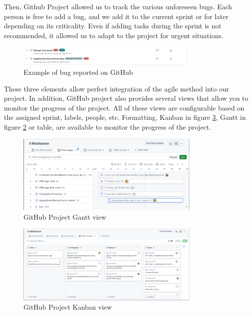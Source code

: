 \newpage

Then, Github Project allowed us to track the various unforeseen bugs.
Each person is free to add a bug, and we add it to the current sprint or for later depending on its criticality.
Even if adding tasks during the sprint is not recommended, it allowed us to adapt to the project for urgent situations.

\begin{figure}[h]
    \centering
    \includegraphics[width=0.8\textwidth]{img/GitHubBug}
    \caption{Example of bug reported on GitHub}
    \label{fig:GitHubBug}
\end{figure}

These three elements allow perfect integration of the agile method into our project.
In addition, GitHub project also provides several views that allow you to monitor the progress of the project.
All of these views are configurable based on the assigned sprint, labels, people, etc.
Formatting, Kanban in figure \ref{fig:GitHubKanban}, Gantt in figure \ref{fig:GitHubGant} or table,
are available to monitor the progress of the project.


\begin{figure}[h]
    \centering
    \includegraphics[width=0.8\textwidth]{img/GitHubGant}
    \caption{GitHub Project Gantt view}
    \label{fig:GitHubGant}
\end{figure}

\begin{figure}[h]
    \centering
    \includegraphics[width=0.8\textwidth]{img/GitHubKanban}
    \caption{GitHub Project Kanban view}
    \label{fig:GitHubKanban}
\end{figure}

